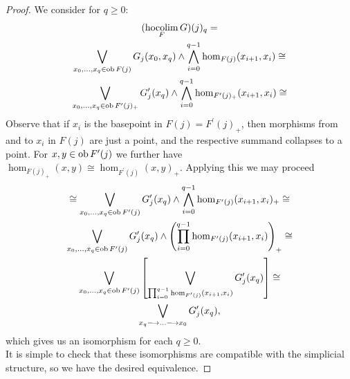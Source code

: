     \begin{proof}
      We consider for $q \geq 0$:
      \begin{gather*}
        (\hocolim_F G)(j)_q = \\%
        \bigvee_{x_0, \ldots, x_q \in \ob F(j)} %
          G_j(x_0,x_q) \wedge \bigwedge_{i=0}^{q-1} \hom_{F(j)}(x_{i+1},x_i) \cong \\%
        \bigvee_{x_0, \ldots, x_q \in \ob F^\prime(j)_+} %
          G^\prime_j(x_q) \wedge \bigwedge_{i=0}^{q-1} %
          \hom_{F^\prime(j)_+}(x_{i+1},x_i) \cong %
      \end{gather*}
      Observe that if $x_i$ is the basepoint in $F(j) = F^\prime(j)_+$, then
      morphisms from and to $x_i$ in $F(j)$ are just a point, and the respective
      summand collapses to a point. For $x, y \in \operatorname{ob} F^\prime(j)$ we further
      have $\hom_{F(j)_+}(x,y) \cong \hom_{F^\prime(j)}(x,y)_+$. Applying this
      we may proceed
      \begin{gather*}
        \cong \bigvee_{x_0, \ldots, x_q \in \ob F^\prime(j)} %
          G^\prime_j(x_q) \wedge \bigwedge_{i=0}^{q-1}
          \hom_{F^\prime(j)}(x_{i+1},x_i)_+ \cong \\%
        \bigvee_{x_0, \ldots, x_q \in \ob F^\prime(j)} %
          G^\prime_j(x_q) \wedge %
          \left (\prod_{i=0}^{q-1} \hom_{F^\prime(j)}(x_{i+1},x_i) \right)_+
          \cong \\%
        \bigvee_{x_0, \ldots, x_q \in \ob F^\prime(j)} \left[%
          \bigvee_{\prod_{i=0}^{q-1} \hom_{F^\prime(j)}(x_{i+1},x_i)} %
          G^\prime_j(x_q) \right] \cong \\%
          \bigvee_{x_q \to \ldots \to x_0} G^\prime_j(x_q),
      \end{gather*}
      which gives us an isomorphism for each $q \geq 0$.\\
      It is simple to check that these isomorphisms are compatible with the
      simplicial structure, so we have the desired equivalence.
    \end{proof}
